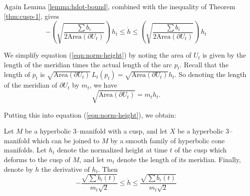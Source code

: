Again Lemma \ref{lemma:hdot-bound}, combined with the inequality of
Theorem \ref{thm:cusp-1}, gives
\begin{equation}
  -\left(\sqrt{\frac{\sum b_i}{2\mbox{Area}(\partial U_t)}}\right) \,
h_t \leq \dot{h} \leq
\left(\sqrt{\frac{\sum b_i}{2\mbox{Area}(\partial U_t)}}\right) \,
h_t
\label{eqn:norm-height}
\end{equation}

We simplify equation (\ref{eqn:norm-height}) by noting the area of
$U_t$ is given by the length of the meridian times the actual length
of the arc $p_t$.  Recall that the length of $p_t$ is
$\sqrt{\mbox{Area}(\partial U_t)}\,L_t(p_t) =
\sqrt{\mbox{Area}(\partial U_t)}h_t.$ So denoting the length of the
meridian of $\partial U_t$ by $m_t$, we have
$$\sqrt{\mbox{Area}(\partial U_t)} = m_t h_t.$$

Putting this into equation (\ref{eqn:norm-height}), we obtain:
\begin{theorem}
  Let $M$ be a hyperbolic 3--manifold with a cusp, and let $X$ be a
  hyperbolic 3--manifold which can be joined to $M$ by a smooth family
  of hyperbolic cone manifolds.  Let $h_t$ denote the normalized
  height at time $t$ of the cusp which deforms to the cusp of $M$, and
  let $m_t$ denote the length of its meridian.  Finally, denote by
  $\dot{h}$ the derivative of $h_t$.  Then
\begin{equation}
  -\frac{\sqrt{\sum b_i(t)}}{m_t\sqrt{2}} \leq \dot{h} \leq
\frac{\sqrt{\sum b_i(t)}}{m_t\sqrt{2}}
\label{eqn:norm-height-mer}
\end{equation}
\label{thm:norm-height-mer}
\end{theorem}


